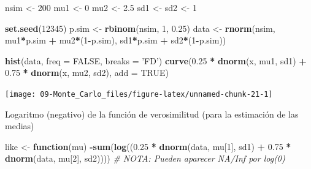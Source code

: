 \documentclass[]{book}
\newenvironment{Shaded}{\begin{snugshade}}{\end{snugshade}}
\newcommand{\KeywordTok}[1]{\textcolor[rgb]{0.13,0.29,0.53}{\textbf{#1}}}
\newcommand{\DataTypeTok}[1]{\textcolor[rgb]{0.13,0.29,0.53}{#1}}
\newcommand{\DecValTok}[1]{\textcolor[rgb]{0.00,0.00,0.81}{#1}}
\newcommand{\FloatTok}[1]{\textcolor[rgb]{0.00,0.00,0.81}{#1}}
\newcommand{\StringTok}[1]{\textcolor[rgb]{0.31,0.60,0.02}{#1}}
\newcommand{\CommentTok}[1]{\textcolor[rgb]{0.56,0.35,0.01}{\textit{#1}}}
\newcommand{\OtherTok}[1]{\textcolor[rgb]{0.56,0.35,0.01}{#1}}
\newcommand{\ControlFlowTok}[1]{\textcolor[rgb]{0.13,0.29,0.53}{\textbf{#1}}}
\newcommand{\OperatorTok}[1]{\textcolor[rgb]{0.81,0.36,0.00}{\textbf{#1}}}
\newcommand{\NormalTok}[1]{#1}
\theoremstyle{definition}
\theoremstyle{definition}
\theoremstyle{definition}
\theoremstyle{remark}
\begin{document}
\begin{Shaded}
\begin{Highlighting}[]
\NormalTok{nsim <-}\StringTok{ }\DecValTok{200}
\NormalTok{mu1 <-}\StringTok{ }\DecValTok{0} 
\NormalTok{mu2 <-}\StringTok{ }\FloatTok{2.5}
\NormalTok{sd1 <-}\StringTok{ }\NormalTok{sd2 <-}\StringTok{ }\DecValTok{1}

\KeywordTok{set.seed}\NormalTok{(}\DecValTok{12345}\NormalTok{)}
\NormalTok{p.sim <-}\StringTok{ }\KeywordTok{rbinom}\NormalTok{(nsim, }\DecValTok{1}\NormalTok{, }\FloatTok{0.25}\NormalTok{)}
\NormalTok{data <-}\StringTok{ }\KeywordTok{rnorm}\NormalTok{(nsim, mu1}\OperatorTok{*}\NormalTok{p.sim }\OperatorTok{+}\StringTok{ }\NormalTok{mu2}\OperatorTok{*}\NormalTok{(}\DecValTok{1}\OperatorTok{-}\NormalTok{p.sim), sd1}\OperatorTok{*}\NormalTok{p.sim }\OperatorTok{+}\StringTok{ }\NormalTok{sd2}\OperatorTok{*}\NormalTok{(}\DecValTok{1}\OperatorTok{-}\NormalTok{p.sim))}

\KeywordTok{hist}\NormalTok{(data, }\DataTypeTok{freq =} \OtherTok{FALSE}\NormalTok{, }\DataTypeTok{breaks =} \StringTok{'FD'}\NormalTok{)}
\KeywordTok{curve}\NormalTok{(}\FloatTok{0.25} \OperatorTok{*}\StringTok{ }\KeywordTok{dnorm}\NormalTok{(x, mu1, sd1) }\OperatorTok{+}\StringTok{ }\FloatTok{0.75} \OperatorTok{*}\StringTok{ }\KeywordTok{dnorm}\NormalTok{(x, mu2, sd2), }\DataTypeTok{add =} \OtherTok{TRUE}\NormalTok{)}
\end{Highlighting}
\end{Shaded}

\begin{center}\texttt{[image: 09-Monte\_Carlo\_files/figure-latex/unnamed-chunk-21-1]} \end{center}

Logaritmo (negativo) de la función de verosimilitud (para la estimación
de las medias)

\begin{Shaded}
\begin{Highlighting}[]
\NormalTok{like <-}\StringTok{ }\ControlFlowTok{function}\NormalTok{(mu)}
  \OperatorTok{-}\KeywordTok{sum}\NormalTok{(}\KeywordTok{log}\NormalTok{((}\FloatTok{0.25} \OperatorTok{*}\StringTok{ }\KeywordTok{dnorm}\NormalTok{(data, mu[}\DecValTok{1}\NormalTok{], sd1) }\OperatorTok{+}\StringTok{ }\FloatTok{0.75} \OperatorTok{*}\StringTok{ }\KeywordTok{dnorm}\NormalTok{(data, mu[}\DecValTok{2}\NormalTok{], sd2))))}
  \CommentTok{# NOTA: Pueden aparecer NA/Inf por log(0)}
\end{Highlighting}
\end{Shaded}
\end{document}
